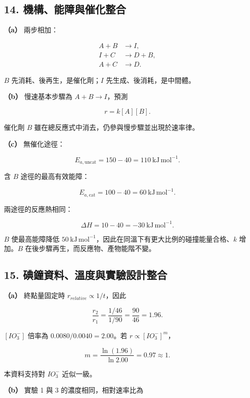 \documentclass[11pt,a4paper]{article}
\begin{document}
\subsection{14. 機構、能障與催化整合}\label{ux6a5fux69cbux80fdux969cux8207ux50acux5316ux6574ux5408}

\textbf{（a）} 兩步相加：

\[
\begin{aligned}
A+B&\longrightarrow I,\\
I+C&\longrightarrow D+B,\\ \hline
A+C&\longrightarrow D.
\end{aligned}
\]

\(B\) 先消耗、後再生，是催化劑；\(I\) 先生成、後消耗，是中間體。

\textbf{（b）} 慢速基本步驟為 \(A+B\rightarrow I\)，預測

\[
r=k[A][B].
\]

催化劑 \(B\) 雖在總反應式中消去，仍參與慢步驟並出現於速率律。

\textbf{（c）} 無催化途徑：

\[
E_{a,\mathrm{uncat}}=150-40=110\ \mathrm{kJ\,mol^{-1}}.
\]

含 \(B\) 途徑的最高有效能障：

\[
E_{a,\mathrm{cat}}=100-40=60\ \mathrm{kJ\,mol^{-1}}.
\]

兩途徑的反應熱相同：

\[
\Delta H=10-40=-30\ \mathrm{kJ\,mol^{-1}}.
\]

\(B\) 使最高能障降低 \(50\ \mathrm{kJ\,mol^{-1}}\)，因此在同溫下有更大比例的碰撞能量合格、\(k\) 增加。\(B\) 在後步驟再生，而反應物、產物能階不變。

\subsection{15. 碘鐘資料、溫度與實驗設計整合}\label{ux7898ux9418ux8cc7ux6599ux6eabux5ea6ux8207ux5be6ux9a57ux8a2dux8a08ux6574ux5408}

\textbf{（a）} 終點量固定時 \(r_{relative}\propto1/t\)，因此

\[
\frac{r_2}{r_1}=\frac{1/46}{1/90}
=\frac{90}{46}=1.96.
\]

\([IO_3^-]\) 倍率為 \(0.0080/0.0040=2.00\)。若 \(r\propto[IO_3^-]^m\)，

\[
m=\frac{\ln(1.96)}{\ln2.00}=0.97\approx1.
\]

本資料支持對 \(IO_3^-\) 近似一級。

\textbf{（b）} 實驗 1 與 3 的濃度相同，相對速率比為
\end{document}
